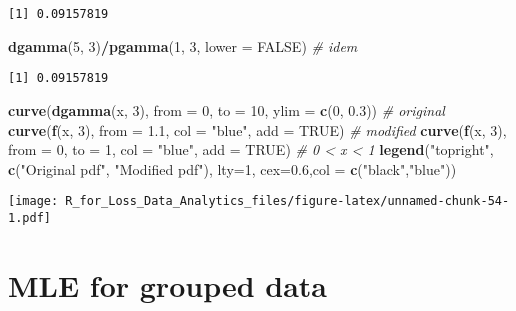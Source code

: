 \documentclass[]{book}
\newenvironment{Shaded}{\begin{snugshade}}{\end{snugshade}}
\newcommand{\KeywordTok}[1]{\textcolor[rgb]{0.13,0.29,0.53}{\textbf{#1}}}
\newcommand{\DataTypeTok}[1]{\textcolor[rgb]{0.13,0.29,0.53}{#1}}
\newcommand{\DecValTok}[1]{\textcolor[rgb]{0.00,0.00,0.81}{#1}}
\newcommand{\FloatTok}[1]{\textcolor[rgb]{0.00,0.00,0.81}{#1}}
\newcommand{\StringTok}[1]{\textcolor[rgb]{0.31,0.60,0.02}{#1}}
\newcommand{\CommentTok}[1]{\textcolor[rgb]{0.56,0.35,0.01}{\textit{#1}}}
\newcommand{\OtherTok}[1]{\textcolor[rgb]{0.56,0.35,0.01}{#1}}
\newcommand{\OperatorTok}[1]{\textcolor[rgb]{0.81,0.36,0.00}{\textbf{#1}}}
\newcommand{\NormalTok}[1]{#1}
\theoremstyle{definition}
\theoremstyle{definition}
\theoremstyle{definition}
\theoremstyle{remark}
\begin{document}
\begin{verbatim}
[1] 0.09157819
\end{verbatim}

\begin{Shaded}
\begin{Highlighting}[]
\KeywordTok{dgamma}\NormalTok{(}\DecValTok{5}\NormalTok{, }\DecValTok{3}\NormalTok{)}\OperatorTok{/}\KeywordTok{pgamma}\NormalTok{(}\DecValTok{1}\NormalTok{, }\DecValTok{3}\NormalTok{, }\DataTypeTok{lower =} \OtherTok{FALSE}\NormalTok{) }\CommentTok{# idem}
\end{Highlighting}
\end{Shaded}

\begin{verbatim}
[1] 0.09157819
\end{verbatim}

\begin{Shaded}
\begin{Highlighting}[]
\KeywordTok{curve}\NormalTok{(}\KeywordTok{dgamma}\NormalTok{(x, }\DecValTok{3}\NormalTok{), }\DataTypeTok{from =} \DecValTok{0}\NormalTok{, }\DataTypeTok{to =} \DecValTok{10}\NormalTok{, }\DataTypeTok{ylim =} \KeywordTok{c}\NormalTok{(}\DecValTok{0}\NormalTok{, }\FloatTok{0.3}\NormalTok{))    }\CommentTok{# original}
\KeywordTok{curve}\NormalTok{(}\KeywordTok{f}\NormalTok{(x, }\DecValTok{3}\NormalTok{), }\DataTypeTok{from =} \FloatTok{1.1}\NormalTok{, }\DataTypeTok{col =} \StringTok{"blue"}\NormalTok{, }\DataTypeTok{add =} \OtherTok{TRUE}\NormalTok{)        }\CommentTok{# modified}
\KeywordTok{curve}\NormalTok{(}\KeywordTok{f}\NormalTok{(x, }\DecValTok{3}\NormalTok{), }\DataTypeTok{from =} \DecValTok{0}\NormalTok{, }\DataTypeTok{to =} \DecValTok{1}\NormalTok{, }\DataTypeTok{col =} \StringTok{"blue"}\NormalTok{, }\DataTypeTok{add =} \OtherTok{TRUE}\NormalTok{)  }\CommentTok{# 0 < x < 1}
\KeywordTok{legend}\NormalTok{(}\StringTok{"topright"}\NormalTok{, }\KeywordTok{c}\NormalTok{(}\StringTok{"Original pdf"}\NormalTok{, }\StringTok{"Modified pdf"}\NormalTok{), }\DataTypeTok{lty=}\DecValTok{1}\NormalTok{, }\DataTypeTok{cex=}\FloatTok{0.6}\NormalTok{,}\DataTypeTok{col =} \KeywordTok{c}\NormalTok{(}\StringTok{"black"}\NormalTok{,}\StringTok{"blue"}\NormalTok{))}
\end{Highlighting}
\end{Shaded}

\texttt{[image: R\_for\_Loss\_Data\_Analytics\_files/figure-latex/unnamed-chunk-54-1.pdf]}

\section{MLE for grouped data}\label{mle-for-grouped-data}
\end{document}
